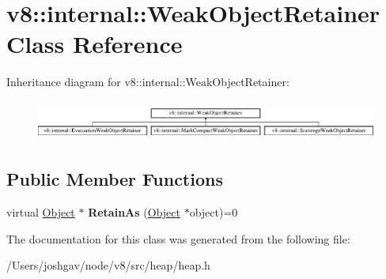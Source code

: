 \hypertarget{classv8_1_1internal_1_1_weak_object_retainer}{}\section{v8\+:\+:internal\+:\+:Weak\+Object\+Retainer Class Reference}
\label{classv8_1_1internal_1_1_weak_object_retainer}
Inheritance diagram for v8\+:\+:internal\+:\+:Weak\+Object\+Retainer\+:\begin{figure}[H]
\begin{center}
\leavevmode
\includegraphics[height=1.328588cm]{classv8_1_1internal_1_1_weak_object_retainer}
\end{center}
\end{figure}
\subsection*{Public Member Functions}
\begin{DoxyCompactItemize}
\item 
virtual \hyperlink{classv8_1_1internal_1_1_object}{Object} $\ast$ {\bfseries Retain\+As} (\hyperlink{classv8_1_1internal_1_1_object}{Object} $\ast$object)=0\hypertarget{classv8_1_1internal_1_1_weak_object_retainer_a603b5e5e9baf52030a4baa4ef249fe81}{}\label{classv8_1_1internal_1_1_weak_object_retainer_a603b5e5e9baf52030a4baa4ef249fe81}

\end{DoxyCompactItemize}


The documentation for this class was generated from the following file\+:\begin{DoxyCompactItemize}
\item 
/\+Users/joshgav/node/v8/src/heap/heap.\+h\end{DoxyCompactItemize}
